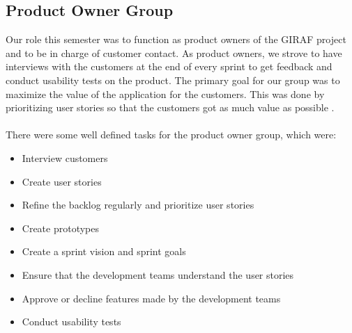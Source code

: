 \subsection{Product Owner Group}
Our role this semester was to function as product owners of the GIRAF project and to be in charge of customer contact. 
As product owners, we strove to have interviews with the customers at the end of every sprint to get feedback and conduct usability tests on the product.
The primary goal for our group was to maximize the value of the application for the customers. 
This was done by prioritizing user stories so that the customers got as much value as possible \autocite{TheScrumGuide}.\\
\\
There were some well defined tasks for the product owner group, which were:
\begin{itemize}
    \item Interview customers
    \item Create user stories    
    \item Refine the backlog regularly and prioritize user stories
    \item Create prototypes
    \item Create a sprint vision and sprint goals
    \item Ensure that the development teams understand the user stories
    \item Approve or decline features made by the development teams
    \item Conduct usability tests
\end{itemize}
\noindent

